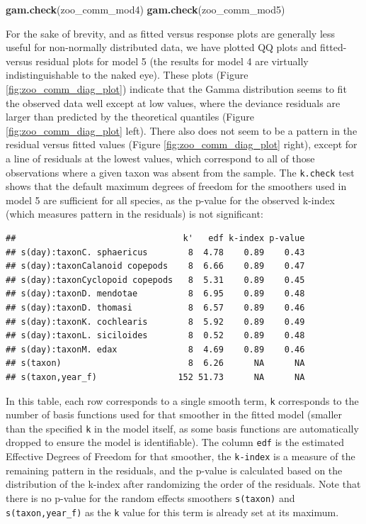 \documentclass[12pt]{article}
\newenvironment{Shaded}{\begin{snugshade}}{\end{snugshade}}
\newcommand{\KeywordTok}[1]{\textcolor[rgb]{0.13,0.29,0.53}{\textbf{#1}}}
\newcommand{\NormalTok}[1]{#1}
\begin{document}
\begin{Shaded}
\begin{Highlighting}[]
\KeywordTok{gam.check}\NormalTok{(zoo_comm_mod4)}
\KeywordTok{gam.check}\NormalTok{(zoo_comm_mod5)}
\end{Highlighting}
\end{Shaded}

For the sake of brevity, and as fitted versus response plots are
generally less useful for non-normally distributed data, we have plotted
QQ plots and fitted-versus residual plots for model 5 (the results for
model 4 are virtually indistinguishable to the naked eye). These plots
(Figure \ref{fig:zoo_comm_diag_plot}) indicate that the Gamma
distribution seems to fit the observed data well except at low values,
where the deviance residuals are larger than predicted by the
theoretical quantiles (Figure \ref{fig:zoo_comm_diag_plot} left). There
also does not seem to be a pattern in the residual versus fitted values
(Figure \ref{fig:zoo_comm_diag_plot} right), except for a line of
residuals at the lowest values, which correspond to all of those
observations where a given taxon was absent from the sample. The
\texttt{k.check} test shows that the default maximum degrees of freedom
for the smoothers used in model 5 are sufficient for all species, as the
p-value for the observed k-index (which measures pattern in the
residuals) is not significant:

\begin{verbatim}
##                                 k'   edf k-index p-value
## s(day):taxonC. sphaericus        8  4.78    0.89    0.43
## s(day):taxonCalanoid copepods    8  6.66    0.89    0.47
## s(day):taxonCyclopoid copepods   8  5.31    0.89    0.45
## s(day):taxonD. mendotae          8  6.95    0.89    0.48
## s(day):taxonD. thomasi           8  6.57    0.89    0.46
## s(day):taxonK. cochlearis        8  5.92    0.89    0.49
## s(day):taxonL. siciloides        8  0.52    0.89    0.48
## s(day):taxonM. edax              8  4.69    0.89    0.46
## s(taxon)                         8  6.26      NA      NA
## s(taxon,year_f)                152 51.73      NA      NA
\end{verbatim}

In this table, each row corresponds to a single smooth term,
\texttt{k\textquotesingle{}} corresponds to the number of basis
functions used for that smoother in the fitted model (smaller than the
specified \texttt{k} in the model itself, as some basis functions are
automatically dropped to ensure the model is identifiable). The column
\texttt{edf} is the estimated Effective Degrees of Freedom for that
smoother, the \texttt{k-index} is a measure of the remaining pattern in
the residuals, and the p-value is calculated based on the distribution
of the k-index after randomizing the order of the residuals. Note that
there is no p-value for the random effects smoothers \texttt{s(taxon)}
and \texttt{s(taxon,year\_f)} as the \texttt{k} value for this term is
already set at its maximum.
\end{document}
